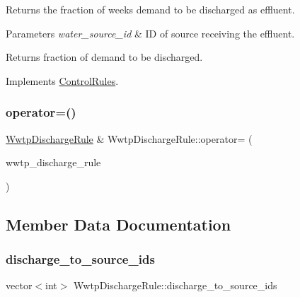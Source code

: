 Returns the fraction of week\textquotesingle{}s demand to be discharged as effluent. 
\begin{DoxyParams}{Parameters}
{\em water\+\_\+source\+\_\+id} & ID of source receiving the effluent. \\
\hline
\end{DoxyParams}
\begin{DoxyReturn}{Returns}
fraction of demand to be discharged. 
\end{DoxyReturn}


Implements \mbox{\hyperlink{classControlRules}{Control\+Rules}}.

\mbox{\label{classWwtpDischargeRule_acde020b347aff843179a318a9d231c8f}} 
\subsubsection{\texorpdfstring{operator=()}{operator=()}}
{\footnotesize\ttfamily \mbox{\hyperlink{classWwtpDischargeRule}{Wwtp\+Discharge\+Rule}} \& Wwtp\+Discharge\+Rule\+::operator= (\begin{DoxyParamCaption}\item[{const \mbox{\hyperlink{classWwtpDischargeRule}{Wwtp\+Discharge\+Rule}} \&}]{wwtp\+\_\+discharge\+\_\+rule }\end{DoxyParamCaption})}



\subsection{Member Data Documentation}
\mbox{\label{classWwtpDischargeRule_ac2f77a9fca93eef3fd26ff1d579130be}} 
\subsubsection{\texorpdfstring{discharge\+\_\+to\+\_\+source\+\_\+ids}{discharge\_to\_source\_ids}}
{\footnotesize\ttfamily vector$<$int$>$ Wwtp\+Discharge\+Rule\+::discharge\+\_\+to\+\_\+source\+\_\+ids}

